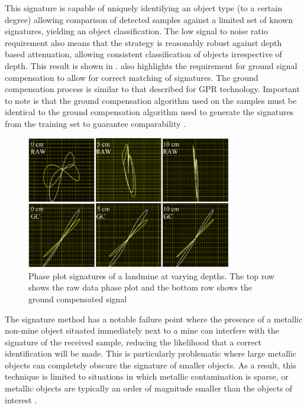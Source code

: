 \documentclass[main.tex]{subfiles}
\begin{document}
This signature is capable of uniquely identifying an object type (to a certain degree) allowing comparison of detected samples against a limited set of known signatures, yielding an object classification. The low signal to noise ratio requirement also means that the strategy is reasonably robust against depth based attenuation, allowing consistent classification of objects irrespective of depth. This result is shown in .  also highlights the requirement for ground signal compensation to allow for correct matching of signatures. The ground compensation process is similar to that described for GPR technology. Important to note is that the ground compensation algorithm used on the samples must be identical to the ground compensation algorithm used to generate the signatures from the training set to guarantee comparability \parencite{Kruger2006}.
\begin{figure}[ht]
\includegraphics[width=0.8\textwidth]{3-LiteratureReview/compensated-signature.png}
\centering
\caption[Phase plot signatures of a landmine at varying depths]{Phase plot signatures of a landmine at varying depths. The top row shows the raw data phase plot and the bottom row shows the ground compensated signal \parencite{Kruger2006}} 
\end{figure}

The signature method has a notable failure point where the presence of a metallic non-mine object situated immediately next to a mine can interfere with the signature of the received sample, reducing the likelihood that a correct identification will be made. This is particularly problematic where large metallic objects can completely obscure the signature of smaller objects. As a result, this technique is limited to situations in which metallic contamination is sparse, or metallic objects are typically an order of magnitude smaller than the objects of interest \parencite{Kruger2006}.
\end{document}
